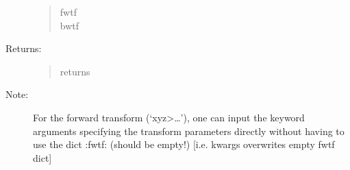 \documentclass[letterpaper,10pt,english]{sphinxmanual}
\begin{document}
\begin{fulllineitems}
\begin{description}
\begin{quote}
\begin{description}
\item[{fwtf}] \leavevmode
{}

\item[{bwtf}] \leavevmode
{}

\end{description}\end{quote}

\item[{Returns:}] \leavevmode\begin{quote}\begin{description}
\item[{returns}] \leavevmode
{}

\end{description}\end{quote}

\item[{Note:}] \leavevmode
For the forward transform (‘xyz\textgreater{}…’), one can input the keyword 
arguments specifying the transform parameters directly without having 
to use the dict :fwtf: (should be empty!) 
{[}i.e. kwargs overwrites empty fwtf dict{]}

\end{description}

\end{fulllineitems}
\end{document}
